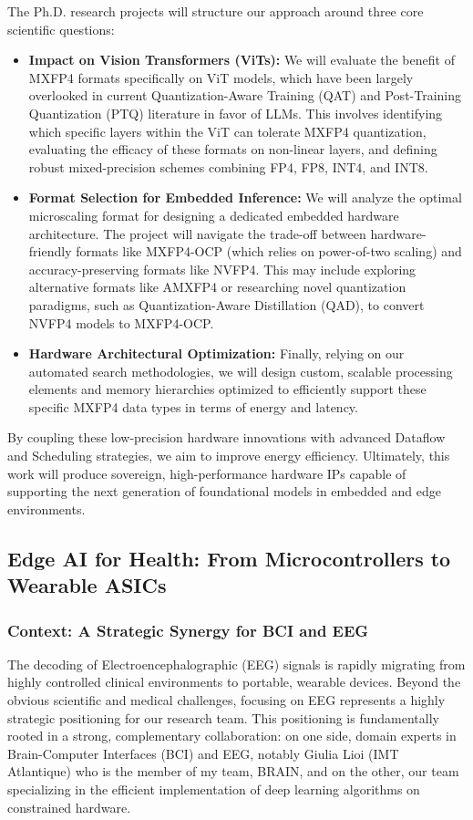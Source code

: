 \documentclass[11pt]{report}
\begin{document}
The Ph.D. research projects will structure our approach around three core scientific questions:

\begin{itemize}
  \item \textbf{Impact on Vision Transformers (ViTs):} We will evaluate the benefit of MXFP4 formats specifically on ViT models, which have been largely overlooked in current Quantization-Aware Training (QAT) and Post-Training Quantization (PTQ) literature in favor of LLMs. This involves identifying which specific layers within the ViT can tolerate MXFP4 quantization, evaluating the efficacy of these formats on non-linear layers, and defining robust mixed-precision schemes combining FP4, FP8, INT4, and INT8.

  \item \textbf{Format Selection for Embedded Inference:} We will analyze the optimal microscaling format for designing a dedicated embedded hardware architecture. The project will navigate the trade-off between hardware-friendly formats like MXFP4-OCP (which relies on power-of-two scaling) and accuracy-preserving formats like NVFP4. This may include exploring alternative formats like AMXFP4 or researching novel quantization paradigms, such as Quantization-Aware Distillation (QAD), to convert NVFP4 models to MXFP4-OCP.

  \item \textbf{Hardware Architectural Optimization:} Finally, relying on our automated search methodologies, we will design custom, scalable processing elements and memory hierarchies optimized to efficiently support these specific MXFP4 data types in terms of energy and latency.
\end{itemize}

By coupling these low-precision hardware innovations with advanced Dataflow and Scheduling strategies, we aim to improve energy efficiency. Ultimately, this work will produce sovereign, high-performance hardware IPs capable of supporting the next generation of foundational models in embedded and edge environments.

\subsection{Edge AI for Health: From Microcontrollers to Wearable ASICs}

\subsubsection{Context: A Strategic Synergy for BCI and EEG}
The decoding of Electroencephalographic (EEG) signals is rapidly migrating from highly controlled clinical environments to portable, wearable devices. Beyond the obvious scientific and medical challenges, focusing on EEG represents a highly strategic positioning for our research team. This positioning is fundamentally rooted in a strong, complementary collaboration: on one side, domain experts in Brain-Computer Interfaces (BCI) and EEG, notably Giulia Lioi (IMT Atlantique) who is the member of my team, BRAIN, and on the other, our team specializing in the efficient implementation of deep learning algorithms on constrained hardware.
\end{document}
